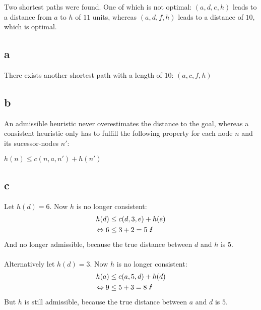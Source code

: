 \documentclass[12pt,a4paper]{scrartcl}
\begin{document}
Two shortest paths were found. One of which is not optimal: $(a,d,e,h)$ leads to a distance from $a$ to $h$ of $11$ units, whereas $(a,d,f,h)$ leads to a distance of $10$, which is optimal. \\

\subsection*{a}
There exists another shortest path with a length of $10$: $(a,c,f,h)$

\subsection*{b}
An admissible heuristic never overestimates the distance to the goal, whereas a consistent heuristic only has to fulfill the following property for each node $n$ and its sucessor-nodes $n'$: 
\begin{center}
	$h(n) \leq c(n,a,n') + h(n')$
\end{center}

\subsection*{c}
Let $h(d) = 6$. Now $h$ is no longer consistent: 
\begin{align*}
	h(d) &\leq c(d,3,e) + h(e) \\
	\Leftrightarrow 6 &\leq 3+2 = 5  \mbox{     \Lightning} \\
\end{align*}
And no longer admissible, because the true distance between $d$ and $h$ is $5$. \\\\

Alternatively let $h(d) = 3$. Now $h$ is no longer consistent: 
\begin{align*}
h(a) &\leq c(a,5,d) + h(d) \\
\Leftrightarrow 9 &\leq 5+3 = 8  \mbox{     \Lightning} \\
\end{align*}
But $h$ is still admissible, because the true distance between $a$ and $d$ is $5$. \\\\
\end{document}

